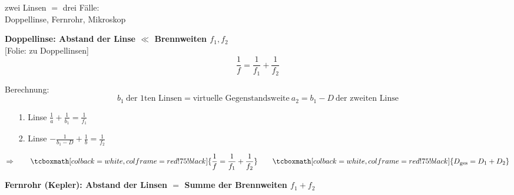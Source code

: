 \documentclass[titlepage,11pt,a4paper,ngerman]{report}
\newcommand{\tx}[1]{\textrm{#1}}
\newcommand{\folie}[1]{\color{gray}[Folie: #1]\color{black}}
\newcommand{\rmbox}[1]{\tcboxmath[colback=white,colframe=red!75!black]{#1}}
\begin{document}
zwei Linsen $ = $ drei Fälle:\\[5pt]
Doppellinse, Fernrohr, Mikroskop\\[5pt]
\begin{enumerate}[1)]
	\begin{minipage}{.7\linewidth}
		\item \textbf{Doppellinse: Abstand der Linse $ \ll $ Brennweiten $ f_1,f_2 $}\\
		\folie{zu Doppellinsen}
		\begin{equation*}
		\frac{1}{f} = \frac{1}{f_1} + \frac{1}{f_2}
		\end{equation*}
	\end{minipage}
	\begin{minipage}{.3\linewidth}
		\centering
	\end{minipage}
	Berechnung:
	\begin{equation*}
	b_1 \ \tx{der 1ten Linsen} = \tx{virtuelle Gegenstandsweite} \ a_2 = b_1 - D \ \tx{der zweiten Linse}
	\end{equation*}
	\begin{itemize}
		\item[1. Linse] $ \frac{1}{a} + \frac{1}{b_1} = \frac{1}{f_1} $
		\item[2. Linse] $ -\frac{1}{b_1 - D} + \frac{1}{b} = \frac{1}{f_2} $
	\end{itemize}
	\begin{equation*}
	\Rightarrow \qquad \rmbox{\frac{1}{f} = \frac{1}{f_1} + \frac{1}{f_2}} \qquad \rmbox{D_{\tx{ges}} = D_1 + D_2}
	\end{equation*}
	\item \textbf{Fernrohr (Kepler): Abstand der Linsen $ = $ Summe der Brennweiten $ f_1 + f_2 $}\\
	

\end{enumerate}
\end{document}
